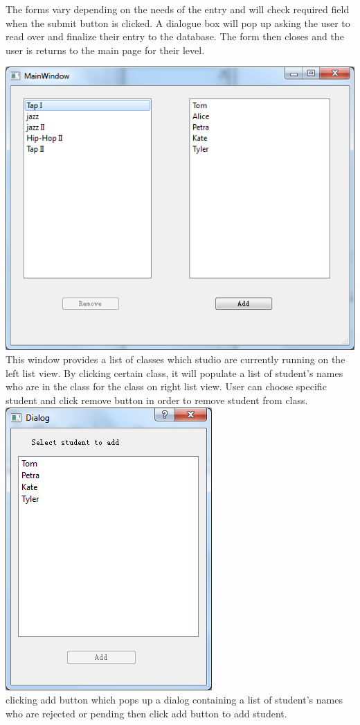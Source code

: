 The forms vary depending on the needs of the entry and will check required field when the submit button is clicked. A dialogue box will pop up asking the user to read over and finalize their entry to the database. The form then closes and the user is returns to the main page for their level.

\includegraphics[scale=0.5]{pics/assin_stu.png}\\
This window provides a list of classes which studio are currently running on the left list view. By clicking certain class, it will populate a list of student's names who are in the class for the class on right list view. User can choose specific student and click remove button in order to remove student from class.
\includegraphics[scale=0.5]{pics/assin_stu_2.png}\\
clicking add button which pops up a dialog containing a list of student's names who are rejected or pending then click add button to add student.

